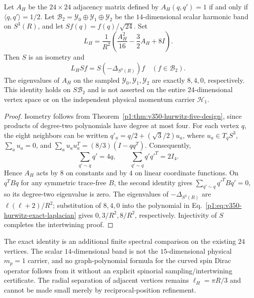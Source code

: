 \documentclass[11pt]{article}
\begin{document}
\begin{theorem}
\label{p1:thm:v350-hurwitz-scalar-laplacian}
Let $A_H$ be the $24\times24$ adjacency matrix defined by
$A_H(q,q')=1$ if and only if $\langle q,q'\rangle=1/2$. Let
$\mathcal B_2=\mathcal Y_0\oplus\mathcal Y_1\oplus\mathcal Y_2$
be the $14$-dimensional scalar harmonic band on $S^3(R)$,
and let $Sf(q)=f(q)/\sqrt{24}$. Set
\begin{equation}
\label{p1:eq:v350-hurwitz-exact-laplacian}
 L_H=\frac1{R^2}\left(\frac{A_H^2}{16}-\frac32A_H+8I\right).
\end{equation}
Then $S$ is an isometry and
\[
 \boxed{L_H Sf=S(-\Delta_{S^3(R)})f\quad(f\in\mathcal B_2).}
\]
The eigenvalues of $A_H$ on the sampled $\mathcal Y_0,\mathcal Y_1,
\mathcal Y_2$ are exactly $8,4,0$, respectively. This identity holds
on $S\mathcal B_2$ and is not asserted on the entire 24-dimensional
vertex space or on the independent physical momentum carrier $\mathcal H_1$.
\end{theorem}
\begin{proof}
Isometry follows from Theorem~\ref{p1:thm:v350-hurwitz-five-design},
since products of degree-two polynomials have degree at most four.
For each vertex $q$, the eight neighbors can be written
$q'_a=q/2+(\sqrt3/2)u_a$, where
$u_a\in T_qS^3$, $\sum_a u_a=0$, and
$\sum_a u_au_a^T=(8/3)(I-qq^T)$. Consequently,
\[
 \sum_{q'\sim q}q'=4q,\qquad
 \sum_{q'\sim q}q'q'^T=2I_4.
\]
Hence $A_H$ acts by $8$ on constants and by $4$ on linear
coordinate functions. On $q^TBq$ for any symmetric trace-free
$B$, the second identity gives $\sum_{q'\sim q}q'^TBq'=0$,
so its degree-two eigenvalue is zero. The eigenvalues of
$-\Delta_{S^3(R)}$ are $\ell(\ell+2)/R^2$; substitution of
$8,4,0$ into the polynomial in Eq.~\eqref{p1:eq:v350-hurwitz-exact-laplacian}
gives $0,3/R^2,8/R^2$, respectively. Injectivity of $S$ completes
the intertwining proof.
\end{proof}

\begin{remark}
\label{p1:rem:v350-hurwitz-spectral-domain}
The exact identity is an additional finite spectral comparison on the
existing $24$ vertices. The scalar $14$-dimensional band is not the
$15$-dimensional physical $m_p=1$ carrier, and no graph-polynomial
formula for the curved spin Dirac operator follows from it without an
explicit spinorial sampling/intertwining certificate. The radial
separation of adjacent vertices remains $\ell_H=\pi R/3$ and cannot
be made small merely by reciprocal-position refinement.
\end{remark}
\end{document}
